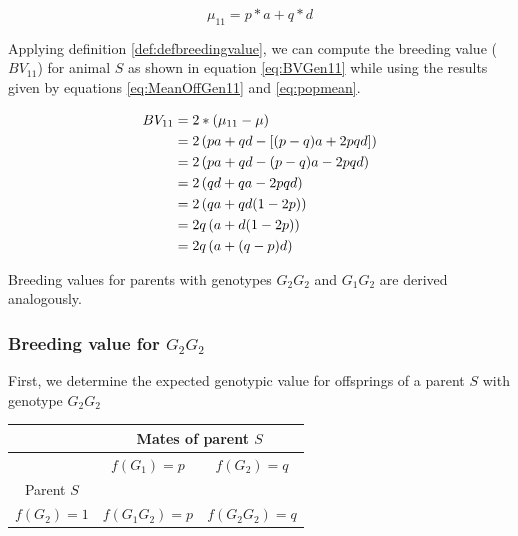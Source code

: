 \documentclass[
]{book}
\theoremstyle{definition}
\theoremstyle{definition}
\theoremstyle{definition}
\theoremstyle{remark}
\begin{document}
\begin{equation}
\mu_{11} = p*a + q*d
\label{eq:MeanOffGen11}
\end{equation}

Applying definition \ref{def:defbreedingvalue}, we can compute the breeding value (\(BV_{11}\)) for animal \(S\) as shown in equation \eqref{eq:BVGen11} while using the results given by equations \eqref{eq:MeanOffGen11} and \eqref{eq:popmean}.

\begin{align}
BV_{11} &=  2*(\mu_{11} - \mu)  \notag \\
        &=  2\left(pa + qd - \left[(p - q)a + 2pqd \right] \right) \notag\\
        &=  2\left(pa + qd - (p - q)a - 2pqd \right) \notag\\
        &=  2\left(qd + qa - 2pqd\right) \notag \\
        &=  2\left(qa + qd(1 - 2p)\right) \notag \\
        &=  2q\left(a + d(1 - 2p)\right) \notag \\
        &=  2q\left(a + (q-p)d\right)
\label{eq:BVGen11}
\end{align}

Breeding values for parents with genotypes \(G_2G_2\) and \(G_1G_2\) are derived analogously.

\hypertarget{breeding-value-for-g_2g_2}{%
\subsubsection{\texorpdfstring{Breeding value for \(G_2G_2\)}{Breeding value for G\_2G\_2}}\label{breeding-value-for-g_2g_2}}

First, we determine the expected genotypic value for offsprings of a parent \(S\) with genotype \(G_2G_2\)

\vspace{5ex}

\begin{center}
\begin{tabular}{|c|c|c|}
\hline
& \multicolumn{2}{|c|}{Mates of parent $S$} \\
\hline
& $f(G_1) = p$       &  $f(G_2) = q$   \\
\hline
Parent $S$       &                    &                 \\
\hline
$f(G_2) = 1$ &  $f(G_1G_2) = p$   &  $f(G_2G_2) = q$\\
\hline
\end{tabular}
\end{center}
\end{document}
